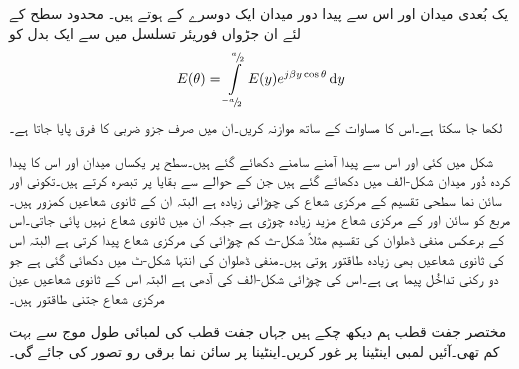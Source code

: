 
یک بُعدی میدان  اور اس سے پیدا دور میدان  ایک دوسرے کے  ہوتے ہیں۔ محدود سطح کے لئے ان جڑواں فوریئر تسلسل میں سے ایک بدل کو
\begin{align}
E(\theta)=\int \limits_{^{-a}\!/\!_2}^{^{a}\!/\!_2} E(y) e^{j \beta y \cos \theta} \dif y
\end{align}
لکھا جا سکتا ہے۔اس کا مساوات  کے ساتھ موازنہ کریں۔ان میں صرف جزو ضربی  کا فرق پایا جاتا ہے۔  

شکل میں کئی  اور اس سے پیدا  آمنے سامنے دکھائے گئے ہیں۔سطح پر یکساں میدان اور اس کا پیدا کردہ دُور میدان شکل-الف میں دکھائے گئے ہیں جن کے حوالے سے بقایا پر تبصرہ کرتے ہیں۔تکونی اور سائن نما سطحی تقسیم کے مرکزی شعاع کی چوڑائی زیادہ ہے البتہ ان کے ثانوی شعاعیں کمزور ہیں۔مربع کو سائن اور  کے مرکزی شعاع مزید زیادہ چوڑی ہے جبکہ ان میں ثانوی شعاع نہیں پائی جاتی۔اس کے برعکس منفی ڈھلوان کی تقسیم مثلاً شکل-ث کم چوڑائی کی مرکزی شعاع پیدا کرتی ہے البتہ اس کی ثانوی شعاعیں بھی زیادہ طاقتور ہوتی ہیں۔منفی ڈھلوان کی انتہا شکل-ٹ میں دکھائی گئی ہے جو دو رکنی تداخُل پیما ہی ہے۔اس کی چوڑائی شکل-الف کی آدھی ہے البتہ اس کے ثانوی شعاعیں عین مرکزی شعاع جتنی طاقتور ہیں۔

مختصر جفت قطب ہم دیکھ چکے ہیں جہاں جفت قطب کی لمبائی طول موج سے بہت کم  تھی۔آئیں لمبی اینٹینا پر غور کریں۔اینٹینا پر سائن نما برقی رو تصور کی جائے گی۔

